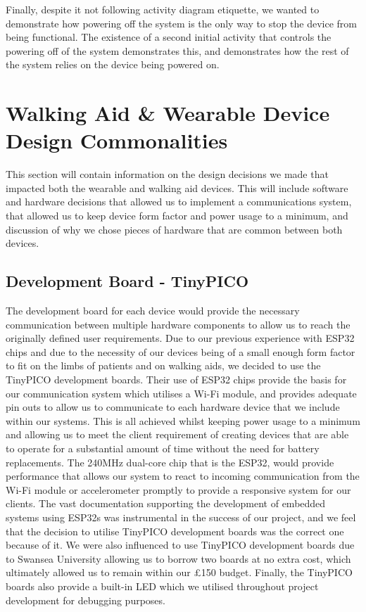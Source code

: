                 Finally, despite it not following activity diagram etiquette, we wanted to demonstrate how powering off the system is the only way to stop the device from being functional. The existence of a second initial activity that controls the powering off of the system demonstrates this, and demonstrates how the rest of the system relies on the device being powered on.

    \section{Walking Aid \& Wearable Device Design Commonalities}
    \label{sec:both_devices}

        This section will contain information on the design decisions we made that impacted both the wearable and walking aid devices. This will include software and hardware decisions that allowed us to implement a communications system, that allowed us to keep device form factor and power usage to a minimum, and discussion of why we chose pieces of hardware that are common between both devices.

        \subsection{Development Board - TinyPICO}
        \label{subsec:development_board}

            The development board for each device would provide the necessary communication between multiple hardware components to allow us to reach the originally defined user requirements. Due to our previous experience with ESP32 chips and due to the necessity of our devices being of a small enough form factor to fit on the limbs of patients and on walking aids, we decided to use the TinyPICO development boards. Their use of ESP32 chips provide the basis for our communication system which utilises a Wi-Fi module, and provides adequate pin outs to allow us to communicate to each hardware device that we include within our systems. This is all achieved whilst keeping power usage to a minimum and allowing us to meet the client requirement of creating devices that are able to operate for a substantial amount of time without the need for battery replacements. The 240MHz dual-core chip that is the ESP32, would provide performance that allows our system to react to incoming communication from the Wi-Fi module or accelerometer promptly to provide a responsive system for our clients. The vast documentation supporting the development of embedded systems using ESP32s was instrumental in the success of our project, and we feel that the decision to utilise TinyPICO development boards was the correct one because of it. We were also influenced to use TinyPICO development boards due to Swansea University allowing us to borrow two boards at no extra cost, which ultimately allowed us to remain within our £150 budget. Finally, the TinyPICO boards also provide a built-in LED which we utilised throughout project development for debugging purposes.

